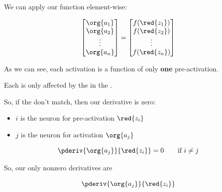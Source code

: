         We can apply our function element-wise:
        
        \begin{equation}
            \begin{bmatrix}
                \org{a_1}\\ \org{a_2}\\ \vdots \\ \org{a_n}
            \end{bmatrix}
            =
            \begin{bmatrix}
                f(\red{z_1})\\ f(\red{z_2}) \\ \vdots \\ f(\red{z_n})
            \end{bmatrix}
        \end{equation}
        
        As we can see, each activation is a function of only \textbf{one} pre-activation.\\
        
        \begin{concept}
            Each  is only affected by the  in the . 
            
            So, if the  don't match, then our derivative is zero:
            
            \begin{itemize}
                \item $i$ is the neuron for pre-activation $\red{z_i}$
                \item $j$ is the neuron for activation $\org{a_j}$
            \end{itemize}
            
            \begin{equation*}
                \pderiv { \org{a_j} }   { \red{z_i} } = 0
                \qquad
                \text{if } i \neq j
            \end{equation*}
            
            So, our only nonzero derivatives are
            
            \begin{equation*}
                \pderiv { \org{a_j} }   { \red{z_i} }
            \end{equation*}
            
        \end{concept}
        
